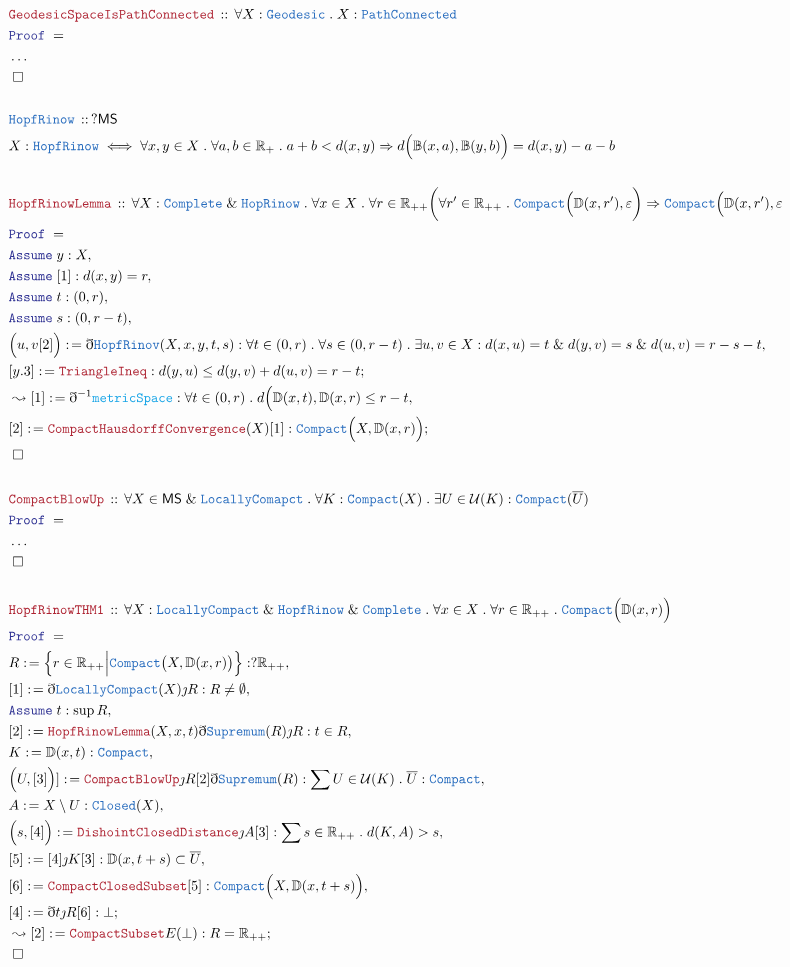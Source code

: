 \documentclass[12pt]{scrartcl}
\newcommand{\TYPE}[1]{\textcolor{NavyBlue}{\mathtt{#1}}}
\newcommand{\FUNC}[1]{\textcolor{Cerulean}{\mathtt{#1}}}
\newcommand{\LOGIC}[1]{\textcolor{Blue}{\mathtt{#1}}}
\newcommand{\THM}[1]{\textcolor{Maroon}{\mathtt{#1}}}
\renewcommand{\.}{\; . \;}
\newcommand{\de}{: \kern 0.1pc =}
\newcommand{\Theorem}[2]{& \THM{#1} \, :: \, #2 \\ & \Proof = \\ }
\newcommand{\DeclareType}[2]{& \TYPE{#1} \, :: \, #2 \\}
\newcommand{\DefineType}[3]{& #1 : \TYPE{#2} \iff #3 \\}
\newcommand{\Page}[1]{ \begin{align*} #1 \end{align*}   }
\newcommand{ \bd }{ \ByDef }
\newcommand{\NoProof}{ & \ldots \\ \EndProof}
\renewcommand{\And}{\; \& \;}
\newcommand{\Imply}{\Rightarrow}
\newcommand{\Reals}{\mathbb{R} }
\newcommand{\Say}[3]{& #1 \de #2 : #3, \\}
\newcommand{\Conclude}[3]{& #1 \de #2 : #3; \\}
\newcommand{\Derive}[3]{& \leadsto #1 \de #2 : #3, \\}
\newcommand{\DeriveConclude}[3]{& \leadsto #1 \de #2 : #3 ; \\}
\newcommand{\Assume}[2]{& \LOGIC{Assume} \; #1 : #2, \\}
\newcommand{\QED}{\; \square}
\newcommand{\EndProof}{& \QED \\}
\newcommand{\ByDef}{\eth}
\newcommand{\ByConstr}{\jmath}
\newcommand{\Proof}{\LOGIC{Proof} \; }
\newcommand{\U}{\mathcal{U}}
\newcommand{\MS}{\mathsf{MS}}
\begin{document}
\Page{
	\Theorem{GeodesicSpaceIsPathConnected}{\forall X : \TYPE{Geodesic} \.  X : \TYPE{PathConnected}}
	\NoProof
	\\
	\DeclareType{HopfRinow}{?\MS}
	\DefineType{X}{HopfRinow}{\forall x,y \in X \. \forall a,b \in \Reals_{+} \. a + b < d(x,y) \Imply d\Big( \mathbb{B}(x,a),\mathbb{B}(y,b) \Big) = d(x,y) - a - b}
	\\
	\Theorem{HopfRinowLemma}
	{
		\forall  X  : \TYPE{Complete}  \And  \TYPE{HopRinow} \.
		\forall x \in X \. 
		\forall r \in \Reals_{++}
		\bigg( \forall r' \in \Reals_{++}  \.     \TYPE{Compact}\Big(\mathbb{D}(x,r') ,\varepsilon\bigg)
		\Imply 
		\TYPE{Compact}\Big(\mathbb{D}(x,r') ,\varepsilon  
	}
	\Assume{y}{X}
	\Assume{[1]}{d(x,y) = r}
	\Assume{t}{(0,r)}
	\Assume{s}{(0,r-t)}
	\Say{\Big( u,v [2]\Big)}{\bd \TYPE{HopfRinov}(X,x,y,t,s)}{\forall  t \in (0,r) \. \forall s \in (0,r-t) \. \exists u,v \in X : d(x,u) = t \And d(y,v) =  s \And d(u,v) = r - s -t }
	\Conclude{[y.3]}{\THM{TriangleIneq}}{ d(y,u ) \le d(y,v) + d(u,v) = r - t}
	\Derive{[1]}{\bd^{-1} \FUNC{metricSpace}}{\forall t \in (0,r) \. d\Big( \mathbb{D}(x,t),\mathbb{D}(x,r) \le r-t}
	\Conclude{[2]}{\THM{CompactHausdorffConvergence}(X)[1]}{\TYPE{Compact}\Big(X,\mathbb{D}(x,r)\Big)}
	\EndProof
	\\
	\Theorem{CompactBlowUp}{\forall X \in \MS \And \TYPE{LocallyComapct} \. \forall K : \TYPE{Compact}(X) \.  \exists U \in \mathcal{U}(K) :  \TYPE{Compact}(\overline{U})}
	\NoProof
	\\
	\Theorem{HopfRinowTHM1}{\forall  X : \TYPE{LocallyCompact} \And \TYPE{HopfRinow} \And \TYPE{Complete} \. \forall x \in X \. \forall r \in \Reals_{++} \. \TYPE{Compact}\Big(\mathbb{D}(x,r)\Big) }
	\Say{R}{ \Big\{ r \in \Reals_{++} \Big|  \TYPE{Compact}\big( X,\mathbb{D}(x,r) \big)   \Big\}}{?\Reals_{++}}
	\Say{[1]}{\bd \TYPE{LocallyCompact}(X) \ByConstr R}{R \neq \emptyset}
	\Assume{t}{\sup R}
	\Say{[2]}{\THM{HopfRinowLemma}(X,x,t)\bd \TYPE{Supremum}(R) \ByConstr R}{t \in R}
	\Say{K}{\mathbb{D}(x,t)}{\TYPE{Compact}}
	\Say{\Big( U,[3]\Big)]}{\THM{CompactBlowUp}\ByConstr R [2] \bd \TYPE{Supremum}(R) }{ \sum U \in \U(K) \. \overline{U} : \TYPE{Compact}}
	\Say{A}{X \setminus U}{\TYPE{Closed}(X)}
	\Say{\Big( s, [4] \Big)}{\THM{DishointClosedDistance}\ByConstr A [3]}{ \sum s \in \Reals_{++} \.  d(K,A) > s  }
	\Say{[5]}{[4]\ByConstr K [3]}{\mathbb{D}(x,t + s) \subset \overline{U}}
	\Say{[6]}{\THM{CompactClosedSubset}[5]}{\TYPE{Compact}\Big( X, \mathbb{D}(x,t + s) \Big)}
	\Conclude{[4]}{\bd t \ByConstr R  [6]}{\bot}
	\DeriveConclude{[2]}{\THM{CompactSubset}E(\bot)}{  R = \Reals_{++} }
	\EndProof
}
\end{document}
